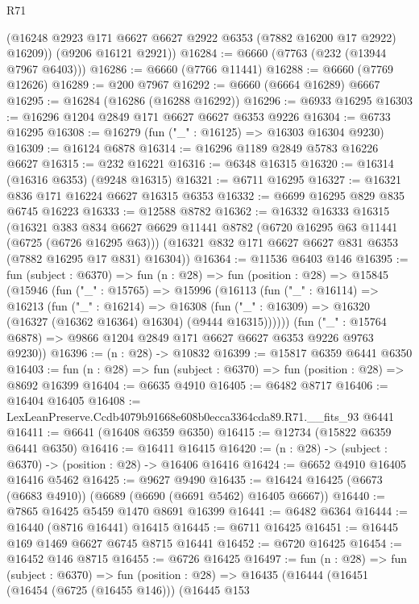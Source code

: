 \begin{lexlean}{R71}
\begin{coremodule}
        (@16248 @2923 @171 @6627 @6627 @2922 @6353 (@7882 @16200 @17 @2922) @16209))
      (@9206 @16121 @2921))
@16284 := @6660 (@7763 (@232 (@13944 @7967 @6403)))
@16286 := @6660 (@7766 @11441)
@16288 := @6660 (@7769 @12626)
@16289 := @200 @7967
@16292 := @6660 (@6664 @16289) @6667
@16295 := @16284 (@16286 (@16288 @16292))
@16296 := @6933 @16295
@16303 := @16296 @1204 @2849 @171 @6627 @6627 @6353 @9226
@16304 := @6733 @16295
@16308 := @16279 (fun ("_" : @16125) => @16303 @16304 @9230)
@16309 := @16124 @6878
@16314 := @16296 @1189 @2849 @5783 @16226 @6627
@16315 := @232 @16221
@16316 := @6348 @16315
@16320 := @16314 (@16316 @6353) (@9248 @16315)
@16321 := @6711 @16295
@16327 := @16321 @836 @171 @16224 @6627 @16315 @6353
@16332 := @6699 @16295 @829 @835 @6745 @16223
@16333 := @12588 @8782
@16362 := @16332
    @16333
    @16315
    (@16321
      @383
      @834
      @6627
      @6629
      @11441
      @8782
      (@6720 @16295 @63 @11441 (@6725 (@6726 @16295 @63)))
      (@16321 @832 @171 @6627 @6627 @831 @6353 (@7882 @16295 @17 @831) @16304))
@16364 := @11536 @6403 @146
@16395 := fun (subject : @6370) =>
  fun (n : @28) =>
  fun (position : @28) =>
  @15845
    (@15946
      (fun ("_" : @15765) =>
      @15996
        (@16113
          (fun ("_" : @16114) =>
          @16213
            (fun ("_" : @16214) =>
            @16308 (fun ("_" : @16309) => @16320 (@16327 (@16362 @16364) @16304) (@9444 @16315))))))
      (fun ("_" : @15764 @6878) => @9866 @1204 @2849 @171 @6627 @6627 @6353 @9226 @9763 @9230))
@16396 := (n : @28) -> @10832
@16399 := @15817 @6359 @6441 @6350
@16403 := fun (n : @28) => fun (subject : @6370) => fun (position : @28) => @8692 @16399
@16404 := @6635 @4910
@16405 := @6482 @8717
@16406 := @16404 @16405
@16408 := LexLeanPreserve.Ccdb4079b91668e608b0ecca3364cda89.R71.__fits_93 @6441
@16411 := @6641 (@16408 @6359 @6350)
@16415 := @12734 (@15822 @6359 @6441 @6350)
@16416 := @16411 @16415
@16420 := (n : @28) -> (subject : @6370) -> (position : @28) -> @16406 @16416
@16424 := @6652 @4910 @16405 @16416 @5462
@16425 := @9627 @9490
@16435 := @16424 @16425 (@6673 (@6683 @4910)) (@6689 (@6690 (@6691 @5462) @16405 @6667))
@16440 := @7865 @16425 @5459 @1470 @8691 @16399
@16441 := @6482 @6364
@16444 := @16440 (@8716 @16441) @16415
@16445 := @6711 @16425
@16451 := @16445 @169 @1469 @6627 @6745 @8715 @16441
@16452 := @6720 @16425
@16454 := @16452 @146 @8715
@16455 := @6726 @16425
@16497 := fun (n : @28) =>
  fun (subject : @6370) =>
  fun (position : @28) =>
  @16435
    (@16444
      (@16451
        (@16454 (@6725 (@16455 @146)))
        (@16445
          @153

\end{coremodule}
\end{lexlean}
